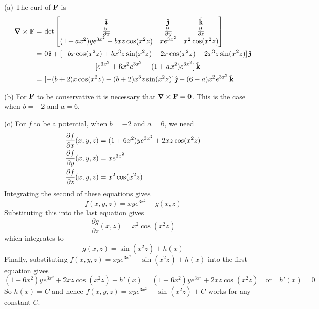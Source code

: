 \begin{solution} (a) The curl of $\mathbf{F}$ is
\begin{align*}
\vnabla\times\vF
&=\det\left[\begin{matrix}
\hi &\hj &\hk \\
\pdiff{}{x} & \pdiff{}{y} & 
                \pdiff{}{z} \\
(1 + ax^2 )ye^{3x^2} -  bxz \cos(x^2 z) & xe^{3x^2} & x^2 \cos(x^2 z) 
\end{matrix}
\right] \\
&= 0\,\hi +[-bx\cos(x^2 z)+bx^3z\sin(x^2 z) 
            -2x\cos(x^2 z) +2x^3z\sin(x^2 z)]\,\hj \\
&\hskip1in + [e^{3x^2} +6x^2e^{3x^2}-(1 + ax^2 )e^{3x^2}]\,\hk \\
&= [-(b+2)x\cos(x^2 z)+(b+2)x^3z\sin(x^2 z)]\,\hj 
           + (6-a)x^2e^{3x^2}\,\hk 
\end{align*}

\noindent (b) For $\mathbf{F}$ to be conservative it is necessary that 
$\vnabla\times\vF=\vZero$. This is the case when $b=-2$ and $a=6$.

\noindent (c) For $f$ to be a potential, when $b=-2$ and $a=6$, we need
\begin{align*}
\pdiff{f}{x}(x,y,z) 
            &= (1 + 6x^2 )ye^{3x^2} + 2xz \cos(x^2 z) \\
\pdiff{f}{y}(x,y,z) &= xe^{3x^2} \\
\pdiff{f}{z}(x,y,z) &= x^2 \cos(x^2 z)
\end{align*}
Integrating the second of these equations gives
\begin{equation*}
f(x,y,z) = xye^{3x^2} +g(x,z)
\end{equation*}
Substituting this into the last equation gives 
\begin{equation*}
\frac{\partial g}{\partial z}(x,z) = x^2 \cos(x^2 z)
\end{equation*}
which integrates to
\begin{equation*}
g(x,z) = \sin(x^2 z) + h(x)
\end{equation*}
Finally, substituting $f(x,y,z) = xye^{3x^2} +\sin(x^2 z) + h(x)$
into the first equation gives
\begin{equation*}
(1+6x^2)ye^{3x^2} +2xz\cos(x^2 z) + h'(x)
=(1 + 6x^2 )ye^{3x^2} + 2xz \cos(x^2 z)\quad\text{or}\quad
h'(x) = 0
\end{equation*}
So $h(x) = C$ and hence $f(x,y,z) = xye^{3x^2} +\sin(x^2 z) + C$  
works for any constant $C$.


\end{solution}
